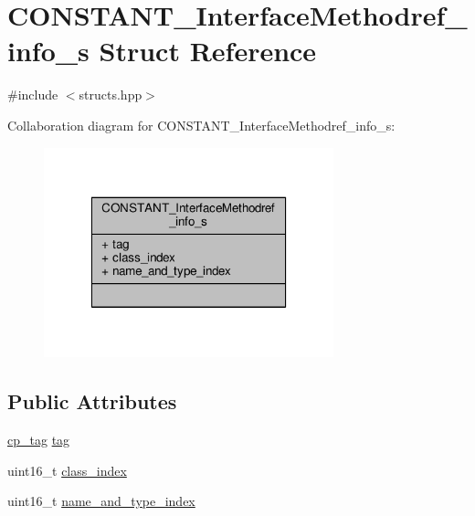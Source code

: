 \hypertarget{structCONSTANT__InterfaceMethodref__info__s}{\section{C\+O\+N\+S\+T\+A\+N\+T\+\_\+\+Interface\+Methodref\+\_\+info\+\_\+s Struct Reference}
\label{structCONSTANT__InterfaceMethodref__info__s}
}


{\ttfamily \#include $<$structs.\+hpp$>$}



Collaboration diagram for C\+O\+N\+S\+T\+A\+N\+T\+\_\+\+Interface\+Methodref\+\_\+info\+\_\+s\+:\nopagebreak
\begin{figure}[H]
\begin{center}
\leavevmode
\includegraphics[width=238pt]{structCONSTANT__InterfaceMethodref__info__s__coll__graph}
\end{center}
\end{figure}
\subsection*{Public Attributes}
\begin{DoxyCompactItemize}
\item 
\hyperlink{structs_8hpp_a17947ec3f3c1f2392eabd36c1ba5fec6}{cp\+\_\+tag} \hyperlink{structCONSTANT__InterfaceMethodref__info__s_a11c19f84f330597406b300345686e89d}{tag}
\item 
uint16\+\_\+t \hyperlink{structCONSTANT__InterfaceMethodref__info__s_abc7d8e3373d4b57beb8c4a6c11783fb3}{class\+\_\+index}
\item 
uint16\+\_\+t \hyperlink{structCONSTANT__InterfaceMethodref__info__s_a11922bbce7b46f1f2bdc91e544335ef1}{name\+\_\+and\+\_\+type\+\_\+index}
\end{DoxyCompactItemize}


